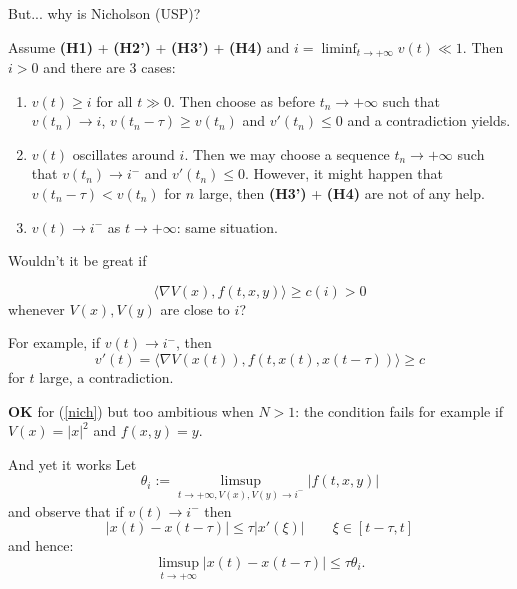 \documentclass[spanish]{beamer}
\def \le{\leqslant}
\def \ge{\geqslant}
\begin{document}
\begin{frame}{But... why is Nicholson (USP)?}
    
    Assume {\bf (H1)} +     {\bf (H2')} +     {\bf (H3')} +     {\bf (H4)} and $i=\liminf_{t\to+\infty} v(t) \ll 1$. Then $i>0$ and there are 3 cases: 
    \medskip 
    
\begin{enumerate}
    \item $v(t)\ge i$ for all $t\gg 0$. Then choose as before
        $t_n\to +\infty$ such that $v(t_n) \to i$, $v(t_n-\tau) \ge v(t_n)$ and $v'(t_n)\le 0$ and a contradiction yields.
        \pause 
       \item 
 $v(t)$ oscillates around $i$. Then we may choose 
    a sequence $t_n\to +\infty$ such that $v(t_n)\to i^-$  and $v'(t_n)\le 0$. However, it might happen that $v(t_n-\tau)< v(t_n)$ for $n$ large, then     {\bf (H3')} + {\bf (H4)} are not of any help.
 \pause  
   \item  
  $v(t)\to i^-$ as $t\to+\infty$: same situation.
    
\end{enumerate}       
    

    
     
    
\end{frame}

\begin{frame}{
}
 Wouldn't it be great if 
 
 $$\langle \nabla V(x),f(t,x,y)\rangle \ge c(i)>0
 $$
 whenever $V(x), V(y)$ are close to $i$? 
 \medskip 
 
 
 For example, if 
 $v(t)\to i^-$, then 
 $$v'(t)=\langle \nabla V(x(t)),f(t,x(t),x(t-\tau))\rangle \ge c
 $$
 for $t$ large, a contradiction. 
\medskip 

\pause 
\textbf{OK} for (\ref{nich}) but too ambitious when $N>1$:
the condition fails for example if $V(x)=|x|^2$ and $f(x,y)=y$.

\end{frame}

\begin{frame}{And yet it works
}
Let 
  $$\theta_i:= \limsup_{t\to+\infty, V(x), V(y)\to i^-} |f(t,x,y)|
$$
and observe that if $v(t)\to i^-$ then 
$$|x(t)-x(t-\tau)|\le \tau |x'(\xi)|\qquad \xi \in [t-\tau,t]$$
and hence: 
$$
\limsup_{t\to+\infty} |x(t)-x(t-\tau)| \le \tau \theta_i.
$$


\end{frame}
\end{document}
